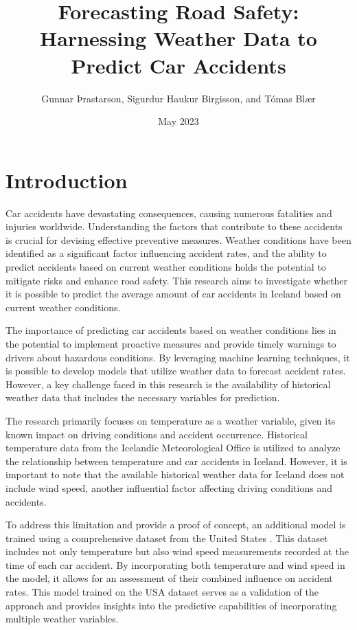 \documentclass{article}
\title{Forecasting Road Safety: Harnessing Weather Data to Predict Car Accidents}
\author{Gunnar Þrastarson, Sigurdur Haukur Birgisson, and Tómas Blær}
\date{May 2023}
\begin{document}
\maketitle
\tableofcontents

\section{Introduction}

Car accidents have devastating consequences, causing numerous fatalities and injuries worldwide. Understanding the factors that contribute to these accidents is crucial for devising effective preventive measures. Weather conditions have been identified as a significant factor influencing accident rates, and the ability to predict accidents based on current weather conditions holds the potential to mitigate risks and enhance road safety. This research aims to investigate whether it is possible to predict the average amount of car accidents in Iceland based on current weather conditions.

The importance of predicting car accidents based on weather conditions lies in the potential to implement proactive measures and provide timely warnings to drivers about hazardous conditions. By leveraging machine learning techniques, it is possible to develop models that utilize weather data to forecast accident rates. However, a key challenge faced in this research is the availability of historical weather data that includes the necessary variables for prediction.

The research primarily focuses on temperature as a weather variable, given its known impact on driving conditions and accident occurrence. Historical temperature data from the Icelandic Meteorological Office \cite{isl_weather_data} is utilized to analyze the relationship between temperature and car accidents in Iceland. However, it is important to note that the available historical weather data for Iceland does not include wind speed, another influential factor affecting driving conditions and accidents.

To address this limitation and provide a proof of concept, an additional model is trained using a comprehensive dataset from the United States \cite{usa_data}. This dataset includes not only temperature but also wind speed measurements recorded at the time of each car accident. By incorporating both temperature and wind speed in the model, it allows for an assessment of their combined influence on accident rates. This model trained on the USA dataset serves as a validation of the approach and provides insights into the predictive capabilities of incorporating multiple weather variables.
\end{document}
